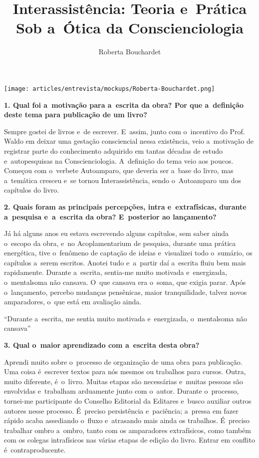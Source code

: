 \documentclass{gescons}
\author{Roberta Bouchardet}
\title{Interassistência: Teoria e~Prática Sob a~Ótica da Conscienciologia}
\begin{document}
    \makeentrevistatitle

    \begin{multicols}{2}

\begin{center}
    \texttt{[image: articles/entrevista/mockups/Roberta-Bouchardet.png]}
\end{center}


\textbf{1.       Qual foi a~motivação para a~escrita da obra? Por que a~definição deste tema para publicação de um livro?}

Sempre gostei de livros e~de escrever. E~assim, junto com o~incentivo do Prof. Waldo em deixar uma gestação consciencial nessa existência, veio a~motivação de registrar parte do conhecimento adquirido em tantas décadas de estudo e~autopesquisas na Conscienciologia. A~definição do tema veio aos poucos. Começou com o~verbete Autoamparo, que deveria ser a~base do livro, mas a~temática cresceu e~se tornou Interassistência, sendo o~Autoamparo um dos capítulos do livro.

\textbf{2.       Quais foram as principais percepções, intra e~extrafísicas, durante a~pesquisa e~a~escrita da obra? E~posterior ao lançamento?}

Já há alguns anos eu estava escrevendo alguns capítulos, sem saber ainda o~escopo da obra, e~no Acoplamentarium de pesquisa, durante uma prática energética, tive o~fenômeno de captação de ideias e~visualizei todo o~sumário, os capítulos a~serem escritos. Anotei tudo e~a~partir daí a~escrita fluiu bem mais rapidamente. Durante a~escrita, sentia-me muito motivada e~energizada, o~mentalsoma não cansava. O~que cansava era o~soma, que exigia parar. Após o~lançamento, percebo mudanças pensênicas, maior tranquilidade, talvez novos amparadores, o~que está em avaliação ainda.

\begin{pullquote}
    ``Durante a~escrita, me sentia muito motivada e~energizada, o~mentalsoma não cansava''
\end{pullquote}


\textbf{3.       Qual o~maior aprendizado com a~escrita desta obra?}

Aprendi muito sobre o~processo de organização de uma obra para publicação. Uma coisa é~escrever textos para nós mesmos ou trabalhos para cursos. Outra, muito diferente, é~o~livro. Muitas etapas são necessárias e~muitas pessoas são envolvidas e~trabalham arduamente junto com o~autor. Durante o~processo, tornei-me participante do Conselho Editorial da Editares e~busco auxiliar outros autores nesse processo. É~preciso persistência e~paciência; a~pressa em fazer rápido acaba assediando o~fluxo e~atrasando mais ainda os trabalhos. É~preciso trabalhar ombro a~ombro, tanto com os amparadores extrafísicos, como também com os colegas intrafísicos nas várias etapas de edição do livro. Entrar em conflito é~contraproducente.


\end{multicols}
\end{document}

